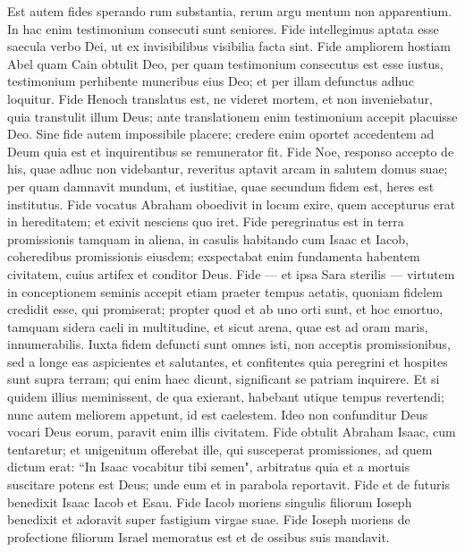 \begin{biblechapter} 
\verse Est autem fides sperando rum substantia, rerum argu mentum non apparentium.  
\verse In hac enim testimonium consecuti sunt seniores. 
\verse Fide intellegimus aptata esse saecula verbo Dei, ut ex invisibilibus visibilia facta sint. 
\verse Fide ampliorem hostiam Abel quam Cain obtulit Deo, per quam testimonium consecutus est esse iustus, testimonium perhibente muneribus eius Deo; et per illam defunctus adhuc loquitur. 
\verse Fide Henoch translatus est, ne videret mortem, et non inveniebatur, quia transtulit illum Deus; ante translationem enim testimonium accepit placuisse Deo. 
\verse Sine fide autem impossibile placere; credere enim oportet accedentem ad Deum quia est et inquirentibus se remunerator fit. 
\verse Fide Noe, responso accepto de his, quae adhuc non videbantur, reveritus aptavit arcam in salutem domus suae; per quam damnavit mundum, et iustitiae, quae secundum fidem est, heres est institutus. 
\verse Fide vocatus Abraham oboedivit in locum exire, quem accepturus erat in hereditatem; et exivit nesciens quo iret. 
\verse Fide peregrinatus est in terra promissionis tamquam in aliena, in casulis habitando cum Isaac et Iacob, coheredibus promissionis eiusdem; 
\verse exspectabat enim fundamenta habentem civitatem, cuius artifex et conditor Deus. 
\verse Fide — et ipsa Sara sterilis — virtutem in conceptionem seminis accepit etiam praeter tempus aetatis, quoniam fidelem credidit esse, qui promiserat; 
\verse propter quod et ab uno orti sunt, et hoc emortuo, tamquam sidera caeli in multitudine, et sicut arena, quae est ad oram maris, innumerabilis. 
\verse Iuxta fidem defuncti sunt omnes isti, non acceptis promissionibus, sed a longe eas aspicientes et salutantes, et confitentes quia peregrini et hospites sunt supra terram; 
\verse qui enim haec dicunt, significant se patriam inquirere. 
\verse Et si quidem illius meminissent, de qua exierant, habebant utique tempus revertendi; 
\verse nunc autem meliorem appetunt, id est caelestem. Ideo non confunditur Deus vocari Deus eorum, paravit enim illis civitatem. 
\verse Fide obtulit Abraham Isaac, cum tentaretur; et unigenitum offerebat ille, qui susceperat promissiones, 
\verse ad quem dictum erat: “In Isaac vocabitur tibi semen", 
\verse arbitratus quia et a mortuis suscitare potens est Deus; unde eum et in parabola reportavit. 
\verse Fide et de futuris benedixit Isaac Iacob et Esau. 
\verse Fide Iacob moriens singulis filiorum Ioseph benedixit et adoravit super fastigium virgae suae. 
\verse Fide Ioseph moriens de profectione filiorum Israel memoratus est et de ossibus suis mandavit. 

\end{biblechapter}
